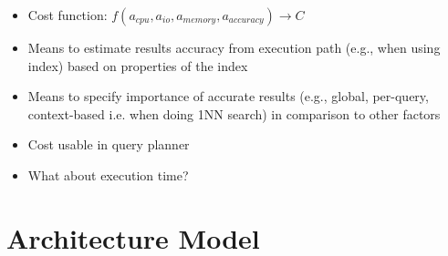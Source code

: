 \begin{itemize}
    \item Cost function: $f(a_{cpu}, a_{io}, a_{memory}, a_{accuracy}) \longrightarrow C$
    \item Means to estimate results accuracy from execution path (e.g., when using index) based on properties of the index
    \item Means to specify importance of accurate results (e.g., global, per-query, context-based i.e. when doing 1NN search) in comparison to other factors
    \item Cost usable in query planner
    \item What about execution time?
\end{itemize}

\section{Architecture Model}





